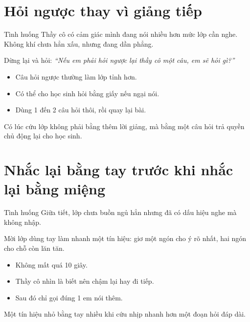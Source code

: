 \section{Hỏi ngược thay vì giảng tiếp}
\begin{tinhhuong}{Tình huống}
Thầy cô có cảm giác mình đang nói nhiều hơn mức lớp cần nghe. Không khí chưa hẳn xấu, nhưng đang dần phẳng.
\end{tinhhuong}
\begin{goiydungngay}
Dừng lại và hỏi: \textit{``Nếu em phải hỏi ngược lại thầy cô một câu, em sẽ hỏi gì?''}
\begin{itemize}
\item Câu hỏi ngược thường làm lớp tỉnh hơn.
\item Có thể cho học sinh hỏi bằng giấy nếu ngại nói.
\item Dùng 1 đến 2 câu hỏi thôi, rồi quay lại bài.
\end{itemize}
\end{goiydungngay}
\begin{cauchot}
Có lúc cứu lớp không phải bằng thêm lời giảng, mà bằng một câu hỏi trả quyền chủ động lại cho học sinh.
\end{cauchot}
\ngancach

\section{Nhắc lại bằng tay trước khi nhắc lại bằng miệng}
\begin{tinhhuong}{Tình huống}
Giữa tiết, lớp chưa buồn ngủ hẳn nhưng đã có dấu hiệu nghe mà không nhập.
\end{tinhhuong}
\begin{goiydungngay}
Mời lớp dùng tay làm nhanh một tín hiệu: giơ một ngón cho ý rõ nhất, hai ngón cho chỗ còn lăn tăn.
\begin{itemize}
\item Không mất quá 10 giây.
\item Thầy cô nhìn là biết nên chậm lại hay đi tiếp.
\item Sau đó chỉ gọi đúng 1 em nói thêm.
\end{itemize}
\end{goiydungngay}
\begin{cauchot}
Một tín hiệu nhỏ bằng tay nhiều khi cứu nhịp nhanh hơn một đoạn hỏi đáp dài.
\end{cauchot}
\ngancach

